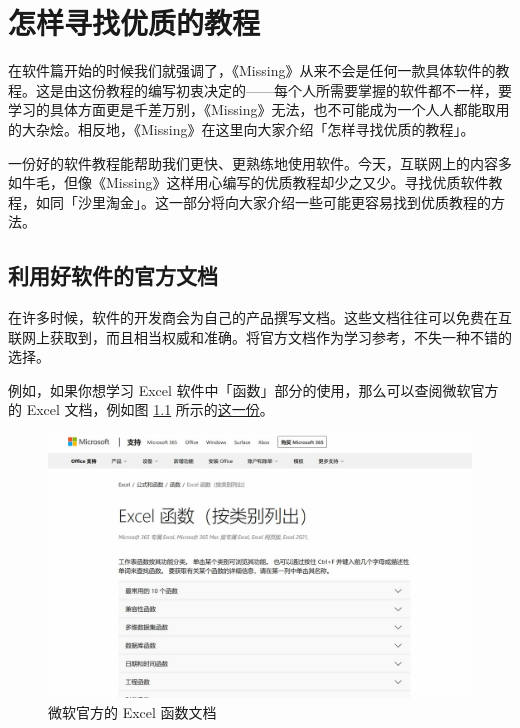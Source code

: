 \chapter{怎样寻找优质的教程}
\label{how-to-find-tutorials}

\begin{intro}
  在软件篇开始的时候我们就强调了，《Missing》从来不会是任何一款具体软件的教程。这是由这份教程的编写初衷决定的——每个人所需要掌握的软件都不一样，要学习的具体方面更是千差万别，《Missing》无法，也不可能成为一个人人都能取用的大杂烩。相反地，《Missing》在这里向大家介绍「怎样寻找优质的教程」。
\end{intro}

一份好的软件教程能帮助我们更快、更熟练地使用软件。今天，互联网上的内容多如牛毛，但像《Missing》这样用心编写的优质教程却少之又少。寻找优质软件教程，如同「沙里淘金」。这一部分将向大家介绍一些可能更容易找到优质教程的方法。

\section{利用好软件的官方文档}

在许多时候，软件的开发商会为自己的产品撰写文档。这些文档往往可以免费在互联网上获取到，而且相当权威和准确。将官方文档作为学习参考，不失一种不错的选择。

例如，如果你想学习 Excel 软件中「函数」部分的使用，那么可以查阅微软官方的 Excel 文档，例如图 \ref{MS_Excel_functions} 所示的\href{https://support.microsoft.com/zh-cn/office/excel-%E5%87%BD%E6%95%B0-%E6%8C%89%E7%B1%BB%E5%88%AB%E5%88%97%E5%87%BA-5f91f4e9-7b42-46d2-9bd1-63f26a86c0eb}{这一份}。

\begin{figure}[htb!]
  \centering
  \includegraphics[width=12cm]{assets/MS_Excel_functions.jpg}
  \caption{微软官方的 Excel 函数文档}
  \label{MS_Excel_functions}
\end{figure}

